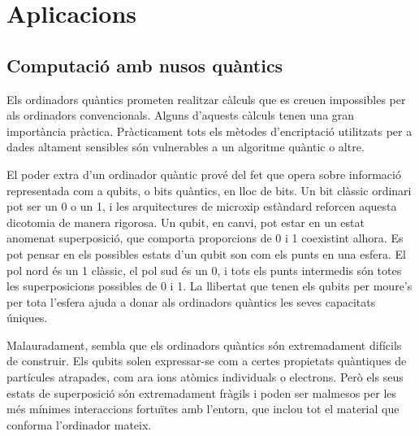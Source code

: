 
\section{Aplicacions}\label{sec:Aplicacions}

\subsection{Computació amb nusos quàntics}\label{sec:nusosquantics}

Els ordinadors quàntics prometen realitzar càlculs que es creuen impossibles per als ordinadors convencionals. Alguns d’aquests càlculs tenen una gran importància pràctica. Pràcticament tots els mètodes d’encriptació utilitzats per a dades altament sensibles són vulnerables a un algoritme quàntic o altre.

El poder extra d’un ordinador quàntic prové del fet que opera sobre informació representada com a qubits, o bits quàntics, en lloc de bits. Un bit clàssic ordinari pot ser un 0 o un 1, i les arquitectures de microxip estàndard reforcen aquesta dicotomia de manera rigorosa. Un qubit, en canvi, pot estar en un estat anomenat superposició, que comporta proporcions de 0 i 1 coexistint alhora. Es pot pensar en els possibles estats d'un qubit son com els punts en una esfera. El pol nord és un 1 clàssic, el pol sud és un 0, i tots els punts intermedis són totes les superposicions possibles de 0 i 1. La llibertat que tenen els qubits per moure’s per tota l’esfera ajuda a donar als ordinadors quàntics les seves capacitats úniques.

Malauradament, sembla que els ordinadors quàntics són extremadament difícils de construir. Els qubits solen expressar-se com a certes propietats quàntiques de partícules atrapades, com ara ions atòmics individuals o electrons. Però els seus estats de superposició són extremadament fràgils i poden ser malmesos per les més mínimes interaccions fortuïtes amb l’entorn, que inclou tot el material que conforma l’ordinador mateix. 